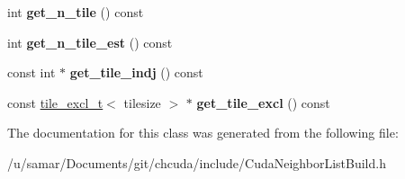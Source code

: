 \begin{DoxyCompactItemize}
int {\bfseries get\+\_\+n\+\_\+tile} () const
\item 
\hypertarget{classCudaNeighborListBuild_a11283f4519dd71ab55f8da8344365b8e}{}\label{classCudaNeighborListBuild_a11283f4519dd71ab55f8da8344365b8e} 
int {\bfseries get\+\_\+n\+\_\+tile\+\_\+est} () const
\item 
\hypertarget{classCudaNeighborListBuild_a073af5f36d92769e0a4f5f4f043bc01c}{}\label{classCudaNeighborListBuild_a073af5f36d92769e0a4f5f4f043bc01c} 
const int $\ast$ {\bfseries get\+\_\+tile\+\_\+indj} () const
\item 
\hypertarget{classCudaNeighborListBuild_a9dfe17855da9ce9e30f574323450cb71}{}\label{classCudaNeighborListBuild_a9dfe17855da9ce9e30f574323450cb71} 
const \hyperlink{structtile__excl__t}{tile\+\_\+excl\+\_\+t}$<$ tilesize $>$ $\ast$ {\bfseries get\+\_\+tile\+\_\+excl} () const
\end{DoxyCompactItemize}


The documentation for this class was generated from the following file\+:\begin{DoxyCompactItemize}
\item 
/u/samar/\+Documents/git/chcuda/include/Cuda\+Neighbor\+List\+Build.\+h\end{DoxyCompactItemize}
